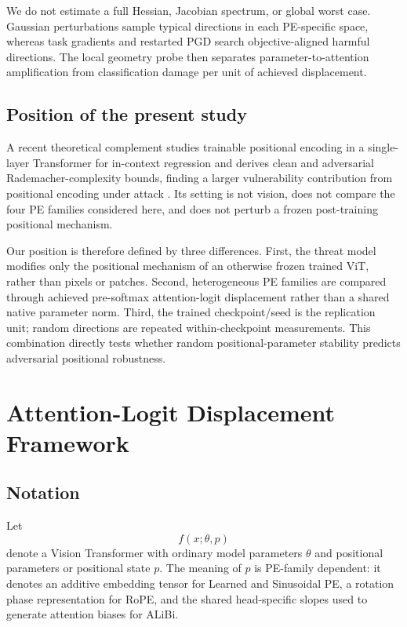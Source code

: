\documentclass[preprint,12pt,authoryear]{elsarticle}
\begin{document}
We do not estimate a full Hessian, Jacobian spectrum, or global worst case.
Gaussian perturbations sample typical directions in each PE-specific
space, whereas task gradients and restarted PGD search objective-aligned
harmful directions. The local geometry probe then separates
parameter-to-attention amplification from classification damage per unit of
achieved displacement.

\subsection{Position of the present study}

A recent theoretical complement studies trainable positional encoding in a
single-layer Transformer for in-context regression and derives clean and
adversarial Rademacher-complexity bounds, finding a larger vulnerability
contribution from positional encoding under attack \citep{he2025impact}.
Its setting is not vision, does not compare the four PE families considered
here, and does not perturb a frozen post-training positional mechanism.

Our position is therefore defined by three differences. First, the threat
model modifies only the positional mechanism of an otherwise frozen trained
ViT, rather than pixels or patches. Second, heterogeneous PE families are
compared through achieved pre-softmax attention-logit displacement rather
than a shared native parameter norm. Third, the trained checkpoint/seed is
the replication unit; random directions are repeated within-checkpoint
measurements. This combination directly tests whether random
positional-parameter stability predicts adversarial positional robustness.


\section{Attention-Logit Displacement Framework}
\label{sec:framework}

\subsection{Notation}

Let
\[
f(x;\theta,p)
\]
denote a Vision Transformer with ordinary model parameters $\theta$
and positional parameters or positional state $p$. The meaning of
$p$ is PE-family dependent: it denotes an additive embedding tensor
for Learned and Sinusoidal PE, a rotation phase representation for
RoPE, and the shared head-specific slopes used to generate attention
biases for ALiBi.
\end{document}
